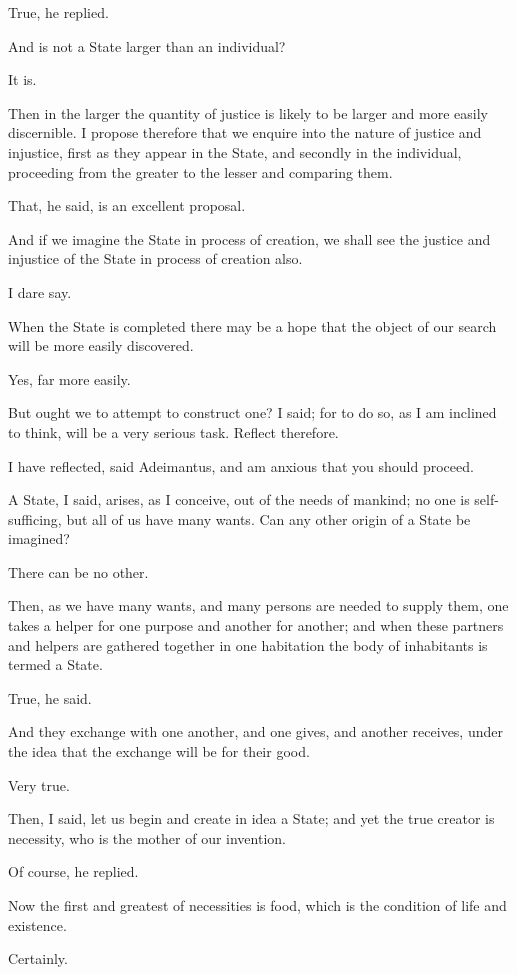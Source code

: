 True, he replied.

And is not a State larger than an individual?

It is.

Then in the larger the quantity of justice is likely to be larger and
more easily discernible. I propose therefore that we enquire into the
nature of justice and injustice, first as they appear in the State, and
secondly in the individual, proceeding from the greater to the lesser
and comparing them.

That, he said, is an excellent proposal.

And if we imagine the State in process of creation, we shall see the
justice and injustice of the State in process of creation also.

I dare say.

When the State is completed there may be a hope that the object of our
search will be more easily discovered.

Yes, far more easily.

But ought we to attempt to construct one? I said; for to do so, as I am
inclined to think, will be a very serious task. Reflect therefore.

I have reflected, said Adeimantus, and am anxious that you should
proceed.

A State, I said, arises, as I conceive, out of the needs of mankind;
no one is self-sufficing, but all of us have many wants. Can any other
origin of a State be imagined?

There can be no other.

Then, as we have many wants, and many persons are needed to supply them,
one takes a helper for one purpose and another for another; and when
these partners and helpers are gathered together in one habitation the
body of inhabitants is termed a State.

True, he said.

And they exchange with one another, and one gives, and another receives,
under the idea that the exchange will be for their good.

Very true.

Then, I said, let us begin and create in idea a State; and yet the true
creator is necessity, who is the mother of our invention.

Of course, he replied.

Now the first and greatest of necessities is food, which is the
condition of life and existence.

Certainly.

